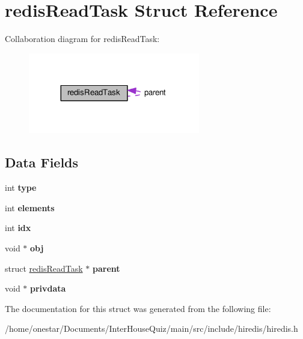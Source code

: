 \hypertarget{structredis_read_task}{\section{redis\+Read\+Task Struct Reference}
\label{structredis_read_task}
}


Collaboration diagram for redis\+Read\+Task\+:\nopagebreak
\begin{figure}[H]
\begin{center}
\leavevmode
\includegraphics[width=212pt]{structredis_read_task__coll__graph}
\end{center}
\end{figure}
\subsection*{Data Fields}
\begin{DoxyCompactItemize}
\item 
\hypertarget{structredis_read_task_ac765329451135abec74c45e1897abf26}{int {\bfseries type}}\label{structredis_read_task_ac765329451135abec74c45e1897abf26}

\item 
\hypertarget{structredis_read_task_a3c5df9c474b82fd6fbb560987c2492c8}{int {\bfseries elements}}\label{structredis_read_task_a3c5df9c474b82fd6fbb560987c2492c8}

\item 
\hypertarget{structredis_read_task_ae40354a1051342eb5a9db005715dcfa9}{int {\bfseries idx}}\label{structredis_read_task_ae40354a1051342eb5a9db005715dcfa9}

\item 
\hypertarget{structredis_read_task_aa919482768c0eac179575481f77e0fa3}{void $\ast$ {\bfseries obj}}\label{structredis_read_task_aa919482768c0eac179575481f77e0fa3}

\item 
\hypertarget{structredis_read_task_a64a586326cf279785e78f44a790dab13}{struct \hyperlink{structredis_read_task}{redis\+Read\+Task} $\ast$ {\bfseries parent}}\label{structredis_read_task_a64a586326cf279785e78f44a790dab13}

\item 
\hypertarget{structredis_read_task_ac5df247494dd66a10946e2d67e56b2a1}{void $\ast$ {\bfseries privdata}}\label{structredis_read_task_ac5df247494dd66a10946e2d67e56b2a1}

\end{DoxyCompactItemize}


The documentation for this struct was generated from the following file\+:\begin{DoxyCompactItemize}
\item 
/home/onestar/\+Documents/\+Inter\+House\+Quiz/main/src/include/hiredis/hiredis.\+h\end{DoxyCompactItemize}
